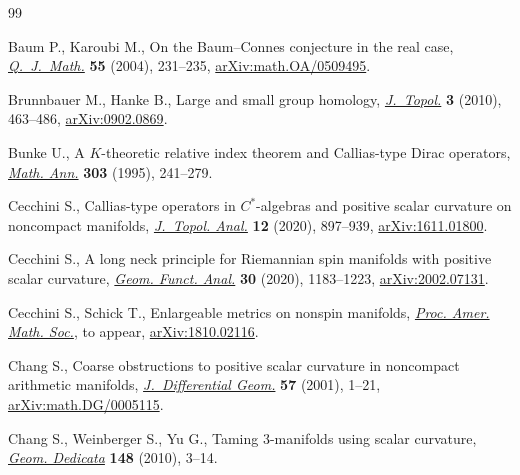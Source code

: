 \documentclass[pdftex]{sigma}
\numberwithin{equation}{section}
\begin{document}
\begin{thebibliography}{99}
\footnotesize\itemsep=-0.5pt

Baum P., Karoubi M., On the {B}aum--{C}onnes conjecture in the real case,
 \href{https://doi.org/10.1093/qjmath/55.3.231}{\textit{Q.~J.~Math.}} \textbf{55} (2004), 231--235, \href{https://arxiv.org/abs/math.OA/0509495}{arXiv:math.OA/0509495}.

Brunnbauer M., Hanke B., Large and small group homology, \href{https://doi.org/10.1112/jtopol/jtq014}{\textit{J.~Topol.}}
 \textbf{3} (2010), 463--486, \href{https://arxiv.org/abs/0902.0869}{arXiv:0902.0869}.

Bunke U., A {$K$}-theoretic relative index theorem and {C}allias-type {D}irac
 operators, \href{https://doi.org/10.1007/BF01460989}{\textit{Math. Ann.}} \textbf{303} (1995), 241--279.

Cecchini S., Callias-type operators in {$C^*$}-algebras and positive scalar
 curvature on noncompact manifolds, \href{https://doi.org/10.1142/S1793525319500687}{\textit{J.~Topol. Anal.}} \textbf{12}
 (2020), 897--939, \href{https://arxiv.org/abs/1611.01800}{arXiv:1611.01800}.

Cecchini S., A long neck principle for Riemannian spin manifolds with positive
 scalar curvature, \href{https://doi.org/10.1007/s00039-020-00545-1}{\textit{Geom. Funct. Anal.}} \textbf{30} (2020), 1183--1223,
 \href{https://arxiv.org/abs/2002.07131}{arXiv:2002.07131}.

Cecchini S., Schick T., Enlargeable metrics on nonspin manifolds, \href{https://doi.org/10.1090/proc/14706}{\textit{Proc.
 Amer. Math. Soc.}}, {t}o appear, \href{https://arxiv.org/abs/1810.02116}{arXiv:1810.02116}.

Chang S., Coarse obstructions to positive scalar curvature in noncompact
 arithmetic manifolds, \href{https://doi.org/10.4310/jdg/1090348087}{\textit{J.~Dif\-ferential Geom.}} \textbf{57} (2001),
 1--21, \href{https://arxiv.org/abs/math.DG/0005115}{arXiv:math.DG/0005115}.

Chang S., Weinberger S., Yu G., Taming 3-manifolds using scalar curvature,
 \href{https://doi.org/10.1007/s10711-009-9402-1}{\textit{Geom. Dedicata}} \textbf{148} (2010), 3--14.


\end{thebibliography}
\end{document}
